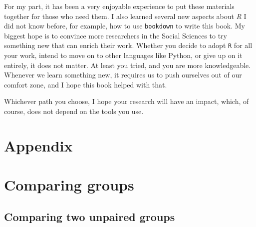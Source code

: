 \documentclass[
  letterpaper,
]{krantz}
\begin{document}
For my part, it has been a very enjoyable experience to put these
materials together for those who need them. I also learned several new
aspects about \emph{R} I did not know before, for example, how to use
\texttt{bookdown} to write this book. My biggest hope is to convince
more researchers in the Social Sciences to try something new that can
enrich their work. Whether you decide to adopt \texttt{R} for all your
work, intend to move on to other languages like Python, or give up on it
entirely, it does not matter. At least you tried, and you are more
knowledgeable. Whenever we learn something new, it requires us to push
ourselves out of our comfort zone, and I hope this book helped with
that.

Whichever path you choose, I hope your research will have an impact,
which, of course, does not depend on the tools you use.


\chapter*{Appendix}\label{sec-appendix}



\chapter*{Comparing groups}\label{sec-appendix-comparing-groups}


\section*{Comparing two unpaired
groups}\label{sec-comparing-two-unpaired-groups}

\end{document}
